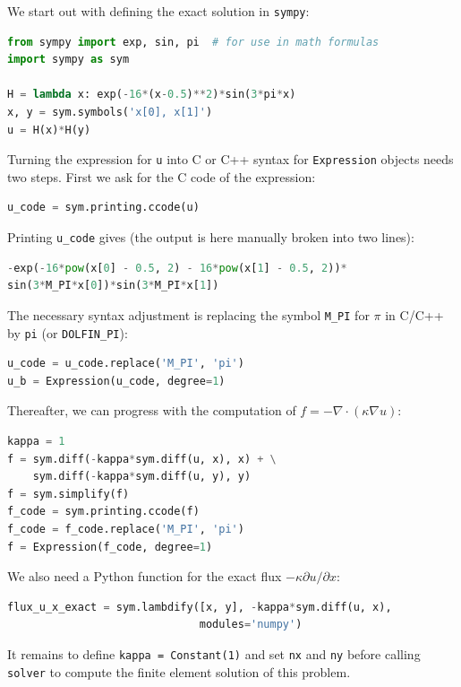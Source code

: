 \documentclass[graybox,envcountchap,sectrefs,final]{svmonodo}
\begin{document}
We start out with defining the exact solution in \texttt{sympy}:

\begin{lstlisting}[language=Python,style=graycolor]
from sympy import exp, sin, pi  # for use in math formulas
import sympy as sym

H = lambda x: exp(-16*(x-0.5)**2)*sin(3*pi*x)
x, y = sym.symbols('x[0], x[1]')
u = H(x)*H(y)
\end{lstlisting}
Turning the expression for \texttt{u} into C or C++ syntax for \texttt{Expression} objects
needs two steps. First we ask for the C code of the expression:

\begin{lstlisting}[language=Python,style=graycolor]
u_code = sym.printing.ccode(u)
\end{lstlisting}
Printing \Verb!u_code! gives (the output is here manually broken into two
lines):

\begin{lstlisting}[language=Python,style=graycolor]
-exp(-16*pow(x[0] - 0.5, 2) - 16*pow(x[1] - 0.5, 2))*
sin(3*M_PI*x[0])*sin(3*M_PI*x[1])
\end{lstlisting}
The necessary syntax adjustment is replacing
the symbol \Verb!M_PI! for $\pi$ in C/C++ by \texttt{pi} (or \Verb!DOLFIN_PI!):

\begin{lstlisting}[language=Python,style=graycolor]
u_code = u_code.replace('M_PI', 'pi')
u_b = Expression(u_code, degree=1)
\end{lstlisting}
Thereafter, we can progress with the computation of
$f = -\nabla\cdot(\kappa\nabla u)$:

\begin{lstlisting}[language=Python,style=graycolor]
kappa = 1
f = sym.diff(-kappa*sym.diff(u, x), x) + \
    sym.diff(-kappa*sym.diff(u, y), y)
f = sym.simplify(f)
f_code = sym.printing.ccode(f)
f_code = f_code.replace('M_PI', 'pi')
f = Expression(f_code, degree=1)
\end{lstlisting}
We also need a Python function for the exact flux
$-\kappa\partial u/\partial x$:

\begin{lstlisting}[language=Python,style=graycolor]
flux_u_x_exact = sym.lambdify([x, y], -kappa*sym.diff(u, x),
                              modules='numpy')
\end{lstlisting}
It remains to define \texttt{kappa = Constant(1)} and set \texttt{nx} and \texttt{ny} before calling
\texttt{solver} to compute the finite element solution of this problem.
\end{document}
